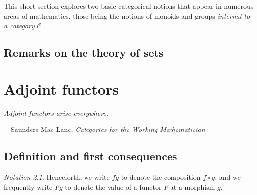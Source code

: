\documentclass[10pt,oneside]{book}
\def\~#1{\mathscr{#1}}
\theoremstyle{plain}
\theoremstyle{definition}
\theoremstyle{remark}
\newtheorem*{notation}{Notation}
\numberwithin{equation}{section}
\numberwithin{figure}{section}
\begin{document}
This short section explores two basic categorical notions that appear in numerous areas of mathematics, those being the notions of monoids and groups \emph{internal to a category} $\~C$

\section{Remarks on the theory of sets}


\chapter{Adjoint functors}
\label{chap:3}

\epigraph{\itshape Adjoint functors arise everywhere.}{---Saunders Mac Lane, \emph{Categories for the Working Mathematician} \cite{maclane}}

\section{Definition and first consequences}

\begin{notation}
    Henceforth, we write $f g$ to denote the composition $f \circ g$, and we frequently write $Fg$ to denote the value of a functor $F$ at a morphism $g$.
\end{notation}
\end{document}

